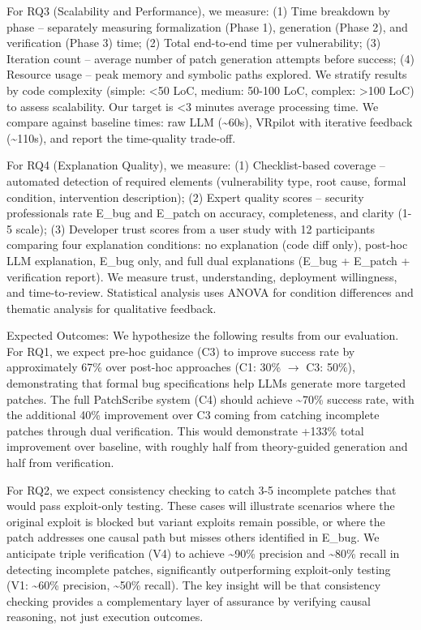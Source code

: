 \documentclass[conference,compsoc]{IEEEtran}
\begin{document}
For RQ3 (Scalability and Performance), we measure: (1) Time breakdown by
phase -- separately measuring formalization (Phase 1), generation (Phase
2), and verification (Phase 3) time; (2) Total end-to-end time per
vulnerability; (3) Iteration count -- average number of patch generation
attempts before success; (4) Resource usage -- peak memory and symbolic
paths explored. We stratify results by code complexity (simple:
\textless50 LoC, medium: 50-100 LoC, complex: \textgreater100 LoC) to
assess scalability. Our target is \textless3 minutes average processing
time. We compare against baseline times: raw LLM (\textasciitilde60s),
VRpilot with iterative feedback (\textasciitilde110s), and report the
time-quality trade-off.

For RQ4 (Explanation Quality), we measure: (1) Checklist-based coverage
-- automated detection of required elements (vulnerability type, root
cause, formal condition, intervention description); (2) Expert quality
scores -- security professionals rate E\_bug and E\_patch on accuracy,
completeness, and clarity (1-5 scale); (3) Developer trust scores from a
user study with 12 participants comparing four explanation conditions:
no explanation (code diff only), post-hoc LLM explanation, E\_bug only,
and full dual explanations (E\_bug + E\_patch + verification report). We
measure trust, understanding, deployment willingness, and
time-to-review. Statistical analysis uses ANOVA for condition
differences and thematic analysis for qualitative feedback.

Expected Outcomes: We hypothesize the following results from our
evaluation. For RQ1, we expect pre-hoc guidance (C3) to improve success
rate by approximately 67\% over post-hoc approaches (C1: 30\% \(\rightarrow\) C3:
50\%), demonstrating that formal bug specifications help LLMs generate
more targeted patches. The full PatchScribe system (C4) should achieve
\textasciitilde70\% success rate, with the additional 40\% improvement
over C3 coming from catching incomplete patches through dual
verification. This would demonstrate +133\% total improvement over
baseline, with roughly half from theory-guided generation and half from
verification.

For RQ2, we expect consistency checking to catch 3-5 incomplete patches
that would pass exploit-only testing. These cases will illustrate
scenarios where the original exploit is blocked but variant exploits
remain possible, or where the patch addresses one causal path but misses
others identified in E\_bug. We anticipate triple verification (V4) to
achieve \textasciitilde90\% precision and \textasciitilde80\% recall in
detecting incomplete patches, significantly outperforming exploit-only
testing (V1: \textasciitilde60\% precision, \textasciitilde50\% recall).
The key insight will be that consistency checking provides a
complementary layer of assurance by verifying causal reasoning, not just
execution outcomes.
\end{document}
